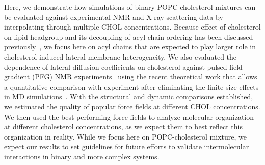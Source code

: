 \documentclass[journal=jctcce]{achemso}
\begin{document}
Here, we demonstrate how simulations of binary POPC-cholesterol mixtures can be evaluated against experimental NMR and X-ray scattering data
by interpolating through multiple CHOL concentrations. Because effect of cholesterol on lipid headgroup and its decoupling of acyl chain ordering has been discussed previously~\cite{botan15,antila22b}, we focus here on acyl chains that are expected to play larger role in cholesterol induced lateral membrane heterogeneity.
We also evaluated 
the dependence of lateral diffusion coefficients on cholesterol against pulsed field gradient (PFG) NMR experiments~\cite{filippov2003effect,filippov2003influence} using the recent theoretical work that allows a quantitative comparison with experiment after eliminating the finite-size effects in MD simulations~\cite{vogele2016divergent,vogele2018hydrodynamics}. With the structural and dynamic comparisons established, we estimated the quality of popular force fields at different CHOL concentrations. We then used the best-performing force fields to analyze molecular organization at different cholesterol concentrations, as we expect them to best reflect this organization in reality.
%
While we focus here on POPC-cholesterol mixture, we expect our results to set guidelines for future efforts to validate intermolecular interactions in binary and more complex systems. 
\end{document}
